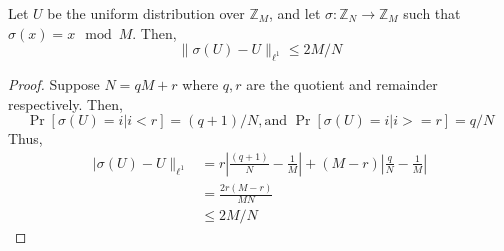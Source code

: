 \begin{lemma} Let $U$ be the uniform distribution over $\mathbb{Z}_M$, and let $\sigma : \mathbb{Z}_N \rightarrow \mathbb{Z}_M $ such that $\sigma(x) = x \mod M$. Then,
$$\| \sigma(U) - U \|_{\ell^1} \leq 2M/N$$
\end{lemma}

\begin{proof}
Suppose $N = qM + r$ where $q,r$ are the quotient and remainder respectively. Then,
$$\Pr[\sigma(U) = i | i < r] = (q+1)/N, \text{and }
\Pr[\sigma(U) = i | i >= r] = q/N$$
Thus, 
\begin{align*}
| \sigma(U) - U \|_{\ell^1} 
&= r \left|\frac{(q+1)}{N} - \frac{1}{M}\right| + (M-r) \left|\frac{q}{N} - \frac{1}{M}\right| \\
&= \frac{2r(M-r)}{MN} \\
&\leq 2M/N
\end{align*}
\end{proof}

